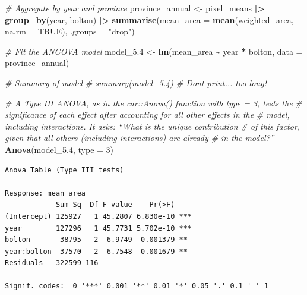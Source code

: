 \documentclass[
  british,
  10pt,
]{article}
\newenvironment{Shaded}{\begin{snugshade}}{\end{snugshade}}
\newcommand{\AttributeTok}[1]{\textcolor[rgb]{0.13,0.29,0.53}{#1}}
\newcommand{\CommentTok}[1]{\textcolor[rgb]{0.56,0.35,0.01}{\textit{#1}}}
\newcommand{\ConstantTok}[1]{\textcolor[rgb]{0.56,0.35,0.01}{#1}}
\newcommand{\DecValTok}[1]{\textcolor[rgb]{0.00,0.00,0.81}{#1}}
\newcommand{\FloatTok}[1]{\textcolor[rgb]{0.00,0.00,0.81}{#1}}
\newcommand{\FunctionTok}[1]{\textcolor[rgb]{0.13,0.29,0.53}{\textbf{#1}}}
\newcommand{\NormalTok}[1]{#1}
\newcommand{\OtherTok}[1]{\textcolor[rgb]{0.56,0.35,0.01}{#1}}
\newcommand{\SpecialCharTok}[1]{\textcolor[rgb]{0.81,0.36,0.00}{\textbf{#1}}}
\newcommand{\StringTok}[1]{\textcolor[rgb]{0.31,0.60,0.02}{#1}}
\begin{document}
\begin{Shaded}
\begin{Highlighting}[]
\CommentTok{\# Aggregate by year and province}
\NormalTok{province\_annual }\OtherTok{\textless{}{-}}\NormalTok{ pixel\_means }\SpecialCharTok{|\textgreater{}}
  \FunctionTok{group\_by}\NormalTok{(year, bolton) }\SpecialCharTok{|\textgreater{}}
  \FunctionTok{summarise}\NormalTok{(}\AttributeTok{mean\_area =} \FunctionTok{mean}\NormalTok{(weighted\_area, }\AttributeTok{na.rm =} \ConstantTok{TRUE}\NormalTok{), }\AttributeTok{.groups =} \StringTok{"drop"}\NormalTok{)}

\CommentTok{\# Fit the ANCOVA model}
\NormalTok{model\_5}\FloatTok{.4} \OtherTok{\textless{}{-}} \FunctionTok{lm}\NormalTok{(mean\_area }\SpecialCharTok{\textasciitilde{}}\NormalTok{ year }\SpecialCharTok{*}\NormalTok{ bolton, }\AttributeTok{data =}\NormalTok{ province\_annual)}

\CommentTok{\# Summary of model}
\CommentTok{\# summary(model\_5.4)  \# Dont print... too long!}

\CommentTok{\# A Type III ANOVA, as in the car::Anova() function with type = 3, tests the}
\CommentTok{\# significance of each effect after accounting for all other effects in the}
\CommentTok{\# model, including interactions. It asks: “What is the unique contribution}
\CommentTok{\# of this factor, given that all others (including interactions) are already}
\CommentTok{\# in the model?”}
\FunctionTok{Anova}\NormalTok{(model\_5}\FloatTok{.4}\NormalTok{, }\AttributeTok{type =} \DecValTok{3}\NormalTok{)}
\end{Highlighting}
\end{Shaded}

\begin{verbatim}
Anova Table (Type III tests)

Response: mean_area
            Sum Sq  Df F value    Pr(>F)    
(Intercept) 125927   1 45.2807 6.830e-10 ***
year        127296   1 45.7731 5.702e-10 ***
bolton       38795   2  6.9749  0.001379 ** 
year:bolton  37570   2  6.7548  0.001679 ** 
Residuals   322599 116                      
---
Signif. codes:  0 '***' 0.001 '**' 0.01 '*' 0.05 '.' 0.1 ' ' 1
\end{verbatim}
\end{document}
